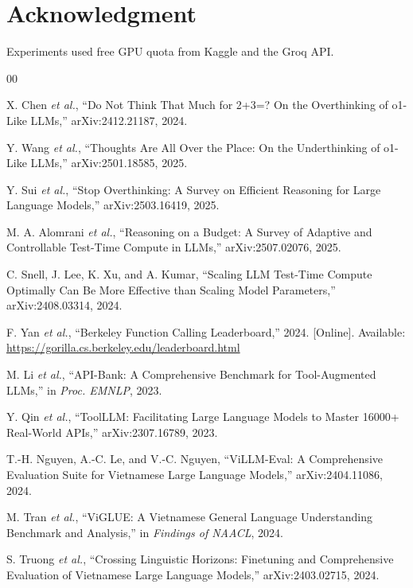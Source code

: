 \documentclass[conference,a4paper]{IEEEtran}
\begin{document}
\section*{Acknowledgment}
Experiments used free GPU quota from Kaggle and the Groq API.

\begin{thebibliography}{00}

X. Chen \emph{et al.}, ``Do Not Think That Much for 2+3=? On the Overthinking
of o1-Like LLMs,'' arXiv:2412.21187, 2024.

Y. Wang \emph{et al.}, ``Thoughts Are All Over the Place: On the Underthinking
of o1-Like LLMs,'' arXiv:2501.18585, 2025.

Y. Sui \emph{et al.}, ``Stop Overthinking: A Survey on Efficient Reasoning for
Large Language Models,'' arXiv:2503.16419, 2025.

M. A. Alomrani \emph{et al.}, ``Reasoning on a Budget: A Survey of Adaptive
and Controllable Test-Time Compute in LLMs,'' arXiv:2507.02076, 2025.

C. Snell, J. Lee, K. Xu, and A. Kumar, ``Scaling LLM Test-Time Compute
Optimally Can Be More Effective than Scaling Model Parameters,''
arXiv:2408.03314, 2024.

F. Yan \emph{et al.}, ``Berkeley Function Calling Leaderboard,'' 2024.
[Online]. Available: \url{https://gorilla.cs.berkeley.edu/leaderboard.html}

M. Li \emph{et al.}, ``API-Bank: A Comprehensive Benchmark for Tool-Augmented
LLMs,'' in \emph{Proc. EMNLP}, 2023.

Y. Qin \emph{et al.}, ``ToolLLM: Facilitating Large Language Models to Master
16000+ Real-World APIs,'' arXiv:2307.16789, 2023.

T.-H. Nguyen, A.-C. Le, and V.-C. Nguyen, ``ViLLM-Eval: A Comprehensive
Evaluation Suite for Vietnamese Large Language Models,'' arXiv:2404.11086,
2024.

M. Tran \emph{et al.}, ``ViGLUE: A Vietnamese General Language Understanding
Benchmark and Analysis,'' in \emph{Findings of NAACL}, 2024.

S. Truong \emph{et al.}, ``Crossing Linguistic Horizons: Finetuning and
Comprehensive Evaluation of Vietnamese Large Language Models,''
arXiv:2403.02715, 2024.


\end{thebibliography}
\end{document}
